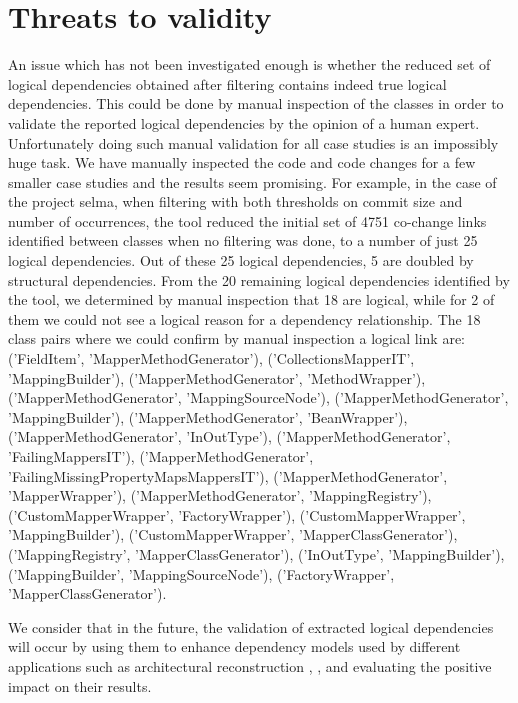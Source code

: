 \documentclass[a4paper,twoside]{article}
\begin{document}
\section {Threats to validity}
\label{sec:validity}


An issue which has not been investigated enough is whether the reduced set of logical dependencies obtained after filtering contains indeed true logical dependencies. This could be done by manual inspection of the classes in order to validate the reported logical dependencies by the opinion of a human expert. Unfortunately doing such manual validation for all case studies is an impossibly huge task. We have manually inspected the code and code changes for a few smaller case studies and the results seem promising. For example, in the case of the project selma, when filtering with both thresholds on commit size and number of occurrences, the tool reduced the initial set of 4751 co-change links identified between classes when no filtering was done, to a number of just 25 logical dependencies. Out of these 25 logical dependencies, 5 are doubled by structural dependencies. From the 20 remaining logical dependencies identified by the tool, we determined by manual inspection that 18 are logical, while for 2 of them we could not see a logical reason for a dependency relationship. 
The 18 class pairs where we could confirm by manual inspection a logical link are: ('FieldItem', 'MapperMethodGenerator'),  ('CollectionsMapperIT', 'MappingBuilder'), ('MapperMethodGenerator', 'MethodWrapper'), ('MapperMethodGenerator', 'MappingSourceNode'),  ('MapperMethodGenerator', 'MappingBuilder'), ('MapperMethodGenerator', 'BeanWrapper'), ('MapperMethodGenerator', 'InOutType'), ('MapperMethodGenerator', 'FailingMappersIT'),  ('MapperMethodGenerator', 'FailingMissingPropertyMapsMappersIT'), ('MapperMethodGenerator', 'MapperWrapper'), ('MapperMethodGenerator', 'MappingRegistry'),  ('CustomMapperWrapper', 'FactoryWrapper'),  ('CustomMapperWrapper', 'MappingBuilder'),  ('CustomMapperWrapper', 'MapperClassGenerator'), ('MappingRegistry', 'MapperClassGenerator'), ('InOutType', 'MappingBuilder'),  ('MappingBuilder', 'MappingSourceNode'),  ('FactoryWrapper', 'MapperClassGenerator').

We consider that in the future, the validation of extracted logical dependencies will occur by using them to enhance dependency models used by different applications such as architectural reconstruction \cite{SoraConti}, \cite{PagerankENASE}, and evaluating the positive impact on their results.   
\end{document}
